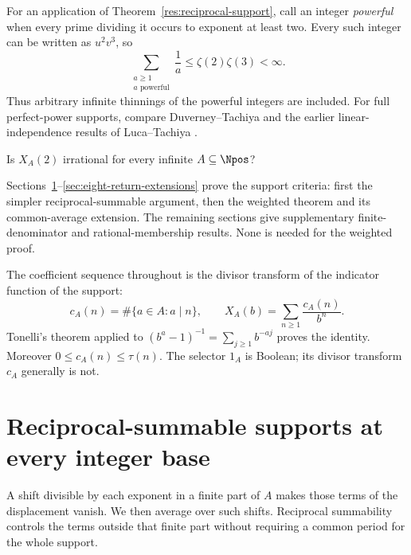 \documentclass[11pt]{article}
\begin{document}
For an application of Theorem~\ref{res:reciprocal-support}, call an integer
\emph{powerful} when every prime dividing it occurs to exponent at least two.  Every such integer can be written
as $u^2v^3$, so
\[
 \sum_{\substack{a\ge1\\a\text{ powerful}}}\frac1a
 \le\zeta(2)\zeta(3)<\infty.
\]
Thus arbitrary infinite thinnings of the powerful integers are included.
For full perfect-power supports, compare Duverney--Tachiya
\cite[Corollary~1.2, p.~4]{duverneytachiya} and the earlier
linear-independence results of Luca--Tachiya
\cite{lucatachiya2014independence}.

\begin{problem}[Erd\H{o}s \#257]\label{res:problem}
Is $X_A(2)$ irrational for every infinite $A\subseteq\Npos$?
\end{problem}
Sections~\ref{sec:reciprocal-support}--\ref{sec:eight-return-extensions}
prove the support criteria: first the simpler reciprocal-summable
argument, then the weighted theorem and its common-average extension.
The remaining sections give supplementary finite-denominator and
rational-membership results.  None is needed for the weighted proof.

The coefficient sequence throughout is the divisor transform of the
indicator function of the support:
\begin{equation}
 c_A(n)=\#\{a\in A:a\mid n\},\qquad
 X_A(b)=\sum_{n\ge1}\frac{c_A(n)}{b^n}.
 \label{eq:incidence}
\end{equation}
Tonelli's theorem applied to
$(b^a-1)^{-1}=\sum_{j\ge1}b^{-aj}$ proves the identity.  Moreover
$0\le c_A(n)\le\tau(n)$.  The selector $1_A$ is Boolean; its divisor transform $c_A$ generally is not.

\section{Reciprocal-summable supports at every integer base}
\label{sec:reciprocal-support}

A shift divisible by each exponent in a finite part of $A$ makes those
terms of the displacement vanish.  We then average over such shifts.
Reciprocal summability controls the terms outside that finite part without
requiring a common period for the whole support.
\end{document}
